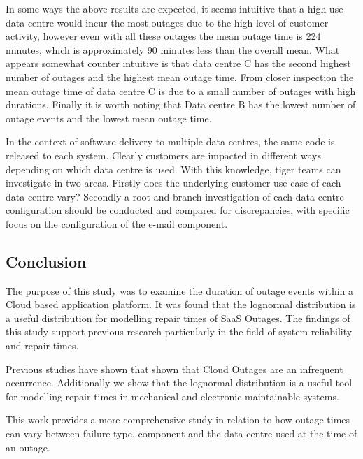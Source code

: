 In some ways the above results are expected, it seems intuitive that a high use data centre would incur the most outages due to the high level of customer activity, however even with all these outages the mean outage time is 224 minutes, which is approximately 90 minutes less than the overall mean. What appears somewhat counter intuitive is that data centre C has the second highest number of outages and the highest mean outage time. From closer inspection the mean outage time of data centre C is due to a small number of outages with high durations. Finally it is worth noting that Data centre B has the lowest number of outage events and the lowest mean outage time.\par

In the context of software delivery to multiple data centres, the same code is released to each system. Clearly customers are impacted in different ways depending on which data centre is used. With this knowledge, tiger teams can investigate in two areas. Firstly does the underlying customer use case of each data centre vary? Secondly a root and branch investigation of each data centre configuration should be conducted and compared for discrepancies, with specific focus on the configuration of the e-mail component. \par

\subsection{Conclusion}
The purpose of this study was to examine the duration of outage events within a Cloud based application platform. It was found that the lognormal distribution is a useful distribution for modelling repair times of SaaS Outages. The findings of this study support previous research particularly in the field of system reliability and repair times. \par

Previous studies have shown that shown that Cloud Outages are an infrequent occurrence. Additionally we show that the lognormal distribution is a useful tool for modelling repair times in mechanical and electronic maintainable systems. \par

This work provides a more comprehensive study in relation to how outage times can vary between failure type, component and the data centre used at the time of an outage. \par

